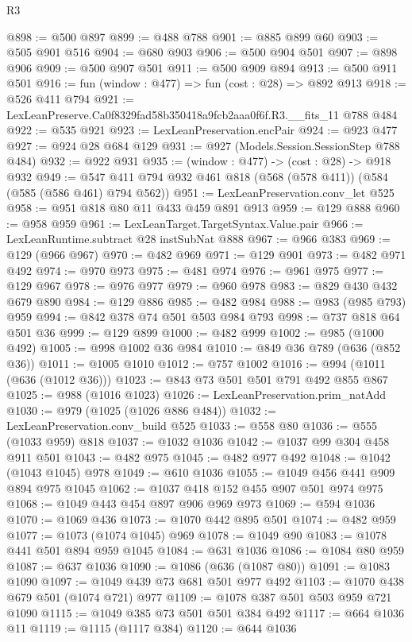 \begin{lexlean}{R3}
\begin{coremodule}
@898 := @500 @897
@899 := @488 @788
@901 := @885 @899 @60
@903 := @505 @901 @516
@904 := @680 @903
@906 := @500 @904 @501
@907 := @898 @906
@909 := @500 @907 @501
@911 := @500 @909 @894
@913 := @500 @911 @501
@916 := fun (window : @477) => fun (cost : @28) => @892 @913
@918 := @526 @411 @794
@921 := LexLeanPreserve.Ca0f8329fad58b350418a9fcb2aaa0f6f.R3.__fits_11 @788 @484
@922 := @535 @921
@923 := LexLeanPreservation.encPair
@924 := @923 @477
@927 := @924 @28 @684 @129
@931 := @927 (Models.Session.SessionStep @788 @484)
@932 := @922 @931
@935 := (window : @477) -> (cost : @28) -> @918 @932
@949 := @547 @411 @794 @932 @461 @818 (@568 (@578 @411)) (@584 (@585 (@586 @461) @794 @562))
@951 := LexLeanPreservation.conv_let @525
@958 := @951 @818 @80 @11 @433 @459 @891 @913
@959 := @129 @888
@960 := @958 @959
@961 := LexLeanTarget.TargetSyntax.Value.pair
@966 := LexLeanRuntime.subtract @28 instSubNat @888
@967 := @966 @383
@969 := @129 (@966 @967)
@970 := @482 @969
@971 := @129 @901
@973 := @482 @971 @492
@974 := @970 @973
@975 := @481 @974
@976 := @961 @975
@977 := @129 @967
@978 := @976 @977
@979 := @960 @978
@983 := @829 @430 @432 @679 @890
@984 := @129 @886
@985 := @482 @984
@988 := @983 (@985 @793) @959
@994 := @842 @378 @74 @501 @503 @984 @793
@998 := @737 @818 @64 @501 @36
@999 := @129 @899
@1000 := @482 @999
@1002 := @985 (@1000 @492)
@1005 := @998 @1002 @36 @984
@1010 := @849 @36 @789 (@636 (@852 @36))
@1011 := @1005 @1010
@1012 := @757 @1002
@1016 := @994 (@1011 (@636 (@1012 @36)))
@1023 := @843 @73 @501 @501 @791 @492 @855 @867
@1025 := @988 (@1016 @1023)
@1026 := LexLeanPreservation.prim_natAdd
@1030 := @979 (@1025 (@1026 @886 @484))
@1032 := LexLeanPreservation.conv_build @525
@1033 := @558 @80
@1036 := @555 (@1033 @959) @818
@1037 := @1032 @1036
@1042 := @1037 @99 @304 @458 @911 @501
@1043 := @482 @975
@1045 := @482 @977 @492
@1048 := @1042 (@1043 @1045) @978
@1049 := @610 @1036
@1055 := @1049 @456 @441 @909 @894 @975 @1045
@1062 := @1037 @418 @152 @455 @907 @501 @974 @975
@1068 := @1049 @443 @454 @897 @906 @969 @973
@1069 := @594 @1036
@1070 := @1069 @436
@1073 := @1070 @442 @895 @501
@1074 := @482 @959
@1077 := @1073 (@1074 @1045) @969
@1078 := @1049 @90
@1083 := @1078 @441 @501 @894 @959 @1045
@1084 := @631 @1036
@1086 := @1084 @80 @959
@1087 := @637 @1036
@1090 := @1086 (@636 (@1087 @80))
@1091 := @1083 @1090
@1097 := @1049 @439 @73 @681 @501 @977 @492
@1103 := @1070 @438 @679 @501 (@1074 @721) @977
@1109 := @1078 @387 @501 @503 @959 @721 @1090
@1115 := @1049 @385 @73 @501 @501 @384 @492
@1117 := @664 @1036 @11
@1119 := @1115 (@1117 @384)
@1120 := @644 @1036

\end{coremodule}
\end{lexlean}
